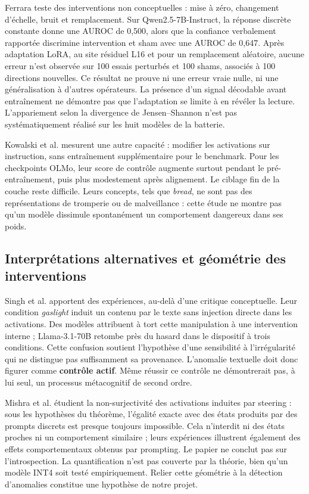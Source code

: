 \documentclass[10pt,a4paper]{article}
\begin{document}
Ferrara \cite{ferrara2026} teste des interventions non conceptuelles : mise à zéro, changement d'échelle, bruit et remplacement. Sur Qwen2.5-7B-Instruct, la réponse discrète constante donne une AUROC de 0,500, alors que la confiance verbalement rapportée discrimine intervention et sham avec une AUROC de 0,647. Après adaptation LoRA, au site résiduel L16 et pour un remplacement aléatoire, aucune erreur n'est observée sur 100 essais perturbés et 100 shams, associés à 100 directions nouvelles. Ce résultat ne prouve ni une erreur vraie nulle, ni une généralisation à d'autres opérateurs. La présence d'un signal décodable avant entraînement ne démontre pas que l'adaptation se limite à en révéler la lecture. L'appariement selon la divergence de Jensen--Shannon n'est pas systématiquement réalisé sur les huit modèles de la batterie.

Kowalski et al. \cite{kowalski2026} mesurent une autre capacité : modifier les activations sur instruction, sans entraînement supplémentaire pour le benchmark. Pour les checkpoints OLMo, leur score de contrôle augmente surtout pendant le pré-entraînement, puis plus modestement après alignement. Le ciblage fin de la couche reste difficile. Leurs concepts, tels que \emph{bread}, ne sont pas des représentations de tromperie ou de malveillance : cette étude ne montre pas qu'un modèle dissimule spontanément un comportement dangereux dans ses poids.

\subsection*{Interprétations alternatives et géométrie des interventions}

Singh et al. \cite{singh2026} apportent des expériences, au-delà d'une critique conceptuelle. Leur condition \emph{gaslight} induit un contenu par le texte sans injection directe dans les activations. Des modèles attribuent à tort cette manipulation à une intervention interne ; Llama-3.1-70B retombe près du hasard dans le dispositif à trois conditions. Cette confusion soutient l'hypothèse d'une sensibilité à l'irrégularité qui ne distingue pas suffisamment sa provenance. L'anomalie textuelle doit donc figurer comme \textbf{contrôle actif}. Même réussir ce contrôle ne démontrerait pas, à lui seul, un processus métacognitif de second ordre.

Mishra et al. \cite{mishra2026} étudient la non-surjectivité des activations induites par steering : sous les hypothèses du théorème, l'égalité exacte avec des états produits par des prompts discrets est presque toujours impossible. Cela n'interdit ni des états proches ni un comportement similaire ; leurs expériences illustrent également des effets comportementaux obtenus par prompting. Le papier ne conclut pas sur l'introspection. La quantification n'est pas couverte par la théorie, bien qu'un modèle INT4 soit testé empiriquement. Relier cette géométrie à la détection d'anomalies constitue une hypothèse de notre projet.
\end{document}
